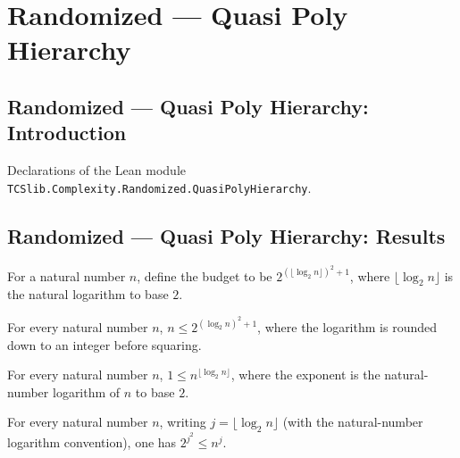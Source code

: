 \section{Randomized --- Quasi Poly Hierarchy}
\subsection*{Randomized --- Quasi Poly Hierarchy: Introduction}

Declarations of the Lean module \texttt{TCSlib.Complexity.Randomized.QuasiPolyHierarchy}.

\subsection*{Randomized --- Quasi Poly Hierarchy: Results}

\begin{definition}
\label{Randomized.quasiPolyBudget}
\leanok
For a natural number $n$, define the budget to be $2^{(\lfloor\log_2 n\rfloor)^2+1}$,
where $\lfloor\log_2 n\rfloor$ is the natural logarithm to base $2$.
\end{definition}

\begin{theorem}
\label{Randomized.le_quasiPolyBudget}
\leanok
{}
For every natural number $n$, $n\leq 2^{(\log_2 n)^2+1}$, where the logarithm is rounded
down to an integer before squaring.
\end{theorem}

\begin{theorem}
\label{Randomized.one_le_pow_log}
\leanok
{}
For every natural number $n$, $1 \le n^{\lfloor \log_2 n\rfloor}$, where the exponent is
the natural-number logarithm of $n$ to base $2$.
\end{theorem}

\begin{theorem}
\label{Randomized.two_pow_log_sq_le}
\leanok
{}
For every natural number $n$, writing $j=\lfloor\log_2 n\rfloor$ (with the
natural-number logarithm convention), one has $2^{j^2}\le n^j$.
\end{theorem}


